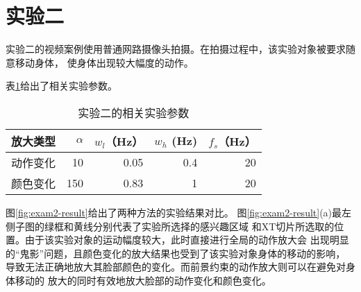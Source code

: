 \section{实验二}
\label{sec:man-moving}

实验二的视频案例使用普通网路摄像头拍摄。在拍摄过程中，该实验对象被要求随意移动身体，
使身体出现较大幅度的动作。

表\ref{tab:exam2-data}给出了相关实验参数。

\begin{table}[htbp]
  \centering
  \caption{实验二的相关实验参数}
  \label{tab:exam2-data}
  \begin{tabular}[c]{crrrr}
    \toprule[1.5pt]
    放大类型 & $\alpha$ & $w_l$（Hz） & $w_h$ (Hz) & $f_s$（Hz）\\
    \midrule
    动作变化 & 10 & 0.05 & 0.4 & 20 \\
    颜色变化 & 150 & 0.83 & 1 & 20 \\
    \bottomrule[1.5pt]
  \end{tabular}
\end{table}

图\ref{fig:exam2-result}给出了两种方法的实验结果对比。
图\ref{fig:exam2-result}(a)最左侧子图的绿框和黄线分别代表了实验所选择的感兴趣区域
和XT切片所选取的位置。由于该实验对象的运动幅度较大，此时直接进行全局的动作放大会
出现明显的“鬼影”问题，且颜色变化的放大结果也受到了该实验对象身体的移动的影响，
导致无法正确地放大其脸部颜色的变化。而前景约束的动作放大则可以在避免对身体移动的
放大的同时有效地放大脸部的动作变化和颜色变化。


